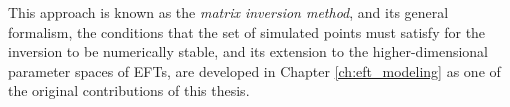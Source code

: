 This approach is known as the \textit{matrix inversion method}, and its general formalism, the conditions that the set of simulated points must satisfy for the inversion to be numerically stable, and its extension to the higher-dimensional parameter spaces of EFTs, are developed in Chapter \ref{ch:eft_modeling} as one of the original contributions of this thesis.









